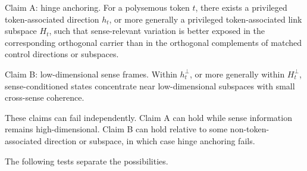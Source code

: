 \documentclass[
  aps,
  reprint,
  superscriptaddress,
  floatfix,
  nofootinbib,
  longbibliography
]{revtex4-2}
\begin{document}
{Claim A: hinge anchoring.}
For a polysemous token $t$, there exists a privileged token-associated
direction $h_t$, or more generally a privileged token-associated link
subspace $H_t$, such that sense-relevant variation is better exposed in
the corresponding orthogonal carrier than in the orthogonal complements
of matched control directions or subspaces.

{Claim B: low-dimensional sense frames.}
Within $h_t^\perp$, or more generally within $H_t^\perp$,
sense-conditioned states concentrate near low-dimensional subspaces
with small cross-sense coherence.

These claims can fail independently. Claim A can hold while sense
information remains high-dimensional. Claim B can hold relative to some
non-token-associated direction or subspace, in which case hinge
anchoring fails.

The following tests separate the possibilities.
\end{document}
